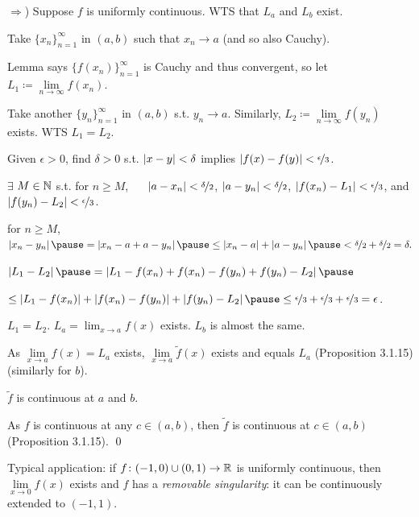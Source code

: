 \documentclass[10pt,aspectratio=169]{beamer}
\begin{document}
\begin{frame}
$\Rightarrow$) Suppose $f$ is uniformly continuous.
\pause
WTS that $L_a$ and $L_b$ exist.

\pause
Take $\{ x_n \}_{n=1}^\infty$ in $(a,b)$ such that $x_n \to a$ (and so also
Cauchy).

\pause
Lemma says
$\bigl\{ f(x_n) \bigr\}_{n=1}^\infty$ is Cauchy and thus convergent, so
\pause
let $L_1 \coloneqq \lim\limits_{n\to\infty} f(x_n)$.

\pause
Take another $\{ y_n \}_{n=1}^\infty$ in $(a,b)$ s.t. $y_n \to a$.
\pause
Similarly, $L_2 \coloneqq \lim\limits_{n\to\infty} f(y_n)$ exists.
\pause
WTS $L_1 = L_2$.

\pause
Given $\epsilon > 0$, \quad
find $\delta > 0$ s.t. $\left\lvert {x-y} \right\rvert < \delta$ implies $\left\lvert {f(x)-f(y)} \right\rvert < \nicefrac{\epsilon}{3}$.

\pause
$\exists$
$M \in {\mathbb{N}}$ s.t. for
$n \geq M$, ~~ $\left\lvert {a-x_n} \right\rvert < \nicefrac{\delta}{2}$,
\pause
$\left\lvert {a-y_n} \right\rvert < \nicefrac{\delta}{2}$,
\pause
$\left\lvert {f(x_n)-L_1} \right\rvert < \nicefrac{\epsilon}{3}$, and
\pause
$\left\lvert {f(y_n)-L_2} \right\rvert < \nicefrac{\epsilon}{3}$.

\pause
\thus \quad for $n \geq M$,
$
\abs{x_n-y_n}
\pause
= 
\abs{x_n-a+a-y_n}
\pause
\leq
\abs{x_n-a}+\abs{a-y_n}
\pause
< \nicefrac{\delta}{2} + \nicefrac{\delta}{2}
=
\delta.
$

\pause

\thus
\quad
$\abs{L_1-L_2}
\pause
=
\abs{L_1-f(x_n)+f(x_n)-f(y_n)+f(y_n)-L_2}
\pause
$

\qquad
$
\leq 
\abs{L_1-f(x_n)}+\abs{f(x_n)-f(y_n)}+\abs{f(y_n)-L_2}
\pause
\leq
\nicefrac{\epsilon}{3} + \nicefrac{\epsilon}{3} + \nicefrac{\epsilon}{3}
=
\epsilon$.

\pause
\thus \quad $L_1 = L_2$.
\pause
\wthus
$L_a = \lim_{x\to a} f(x)$ exists.
\quad
\pause
$L_b$ is almost the same.

\medskip
\pause

As $\lim\limits_{x\to a} f(x) = L_a$ exists, $\lim\limits_{x\to a} \widetilde{f}(x)$ exists
and equals $L_a$ (Proposition 3.1.15)
\pause \quad(similarly for $b$).

\pause
\thus \quad $\widetilde{f}$ is continuous at $a$ and $b$.

\pause
As $f$ is continuous at any $c \in (a,b)$,
then $\widetilde{f}$ is continuous at $c \in (a,b)$ (Proposition 3.1.15).
\qed

\medskip
\pause

Typical application:
if $f \colon (-1,0) \cup (0,1) \to {\mathbb{R}}$ is uniformly continuous,
then $\lim\limits_{x\to 0} f(x)$ exists and $f$
has a \emph{removable singularity}:
it can be continuously extended to $(-1,1)$.

\end{frame}
\end{document}
